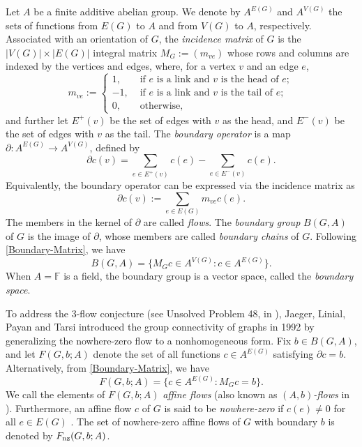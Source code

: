 \documentclass[12pt]{article}%
\renewcommand*{\bm}[1]{#1}%
\numberwithin{equation}{section}
\begin{document}
Let $A$ be a finite additive abelian group. We denote by $A^{E(G)}$ and $A^{V(G)}$ the sets of functions from $E(G)$ to $A$ and from $V(G)$ to $A$, respectively. Associated with an orientation of $G$, the {\em incidence matrix} of $G$ is the $|V(G)|\times |E(G)|$ integral matrix $M_G:=(m_{ve})$ whose rows and columns are indexed by the vertices and edges, where, for a vertex $v$ and an edge $e$,
\[
m_{ve}:=\begin{cases}
1, & \text{ if } e \text{ is a link and } v \text{ is the head of } e;\\
-1,& \text{ if } e \text{ is a link and } v \text{ is the tail of } e;\\
0,& \text{ otherwise},
\end{cases}
\]
and further let $E^+(v)$ be the set of edges with $v$ as the head, and $E^-(v)$ be the set of edges with $v$ as the tail. The {\em boundary operator}  is a map $\partial:A^{E(G)}\to A^{V(G)}$, defined by
\[
\partial\bm c(v)=\sum_{e \in E^{+}(v)} \bm c(e)-\sum_{e \in E^{-}(v)}\bm c(e).
\]
Equivalently, the boundary operator can be expressed via the incidence matrix as
\begin{equation}\label{Boundary-Matrix}
\partial\bm c(v):=\sum_{e\in E(G)}m_{ve}\bm c(e).
\end{equation}
The members in the kernel of $\partial$ are called {\em flows}. The {\em boundary group} $B(G,A)$ of $G$ is the image of $\partial$, whose members are called {\em boundary chains} of $G$.  Following \eqref{Boundary-Matrix}, we have 
\[
B(G,A)=\big\{M_G\bm c\in A^{V(G)}:\bm c\in A^{E(G)}\big\}.
\]
When $A=\mathbb{F}$ is a field, the boundary group is a vector space, called the {\em boundary space}.


To address the 3-flow conjecture (see Unsolved Problem 48, in \cite{Bondy1976}), Jaeger, Linial, Payan and Tarsi \cite{Jaeger1992} introduced the group connectivity of graphs in 1992 by generalizing the nowhere-zero flow to a nonhomogeneous form. Fix $\bm b\in B(G,A)$, and let $F(G,\bm b;A)$ denote the set of all functions $\bm c\in A^{E(G)}$ satisfying $\partial\bm c=\bm b$. Alternatively, from \eqref{Boundary-Matrix}, we have
\[
F(G,\bm b;A)=\big\{\bm c\in A^{E(G)}:M_G\bm c=\bm b\big\}.
\]
We call the elements of $F(G,\bm b;A)$ {\em affine flows} (also known as {\em  $(A,\bm b)$-flows} in \cite{Lai2006}).  Furthermore, an affine flow $\bm c$ of $G$ is said to be  {\em nowhere-zero} if $\bm c(e)\ne 0$ for all $e\in E(G)$ . The set of nowhere-zero affine flows of $G$ with boundary $\bm b$ is denoted by $F_{\rm nz}(G,\bm b;A)$.
\end{document}
